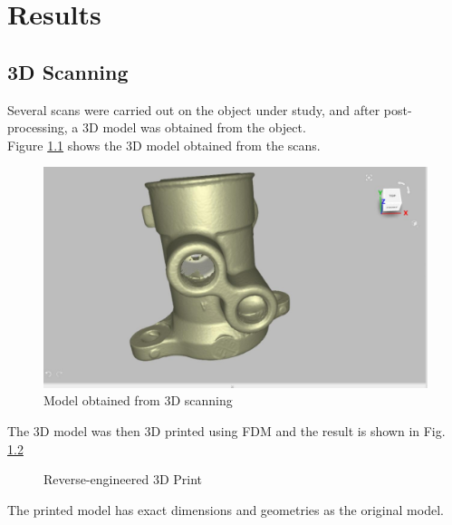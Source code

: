 \chapter{Results}
\section{3D Scanning}
Several scans were carried out on the object under study, and after post-processing, a 3D model was obtained from the object.\\
Figure \ref{fig:scanned} shows the 3D model obtained from the scans.
 \begin{center}
 	\begin{figure}[!h]
 	\centering
 	\includegraphics[width=0.64\linewidth]{Figures/Figure 1}
 	\caption[Scanned 3D model]{Model obtained from 3D scanning}
 	\label{fig:scanned}
 	\end{figure}
 \end{center}
The 3D model was then 3D printed using FDM and the result is shown in Fig. \ref{fig:result}
\begin{figure}[!h]%
	\centering
	\qquad
	\caption{Reverse-engineered 3D Print}%
	\label{fig:result}%
\end{figure}
The printed model has exact dimensions and geometries as the original model.